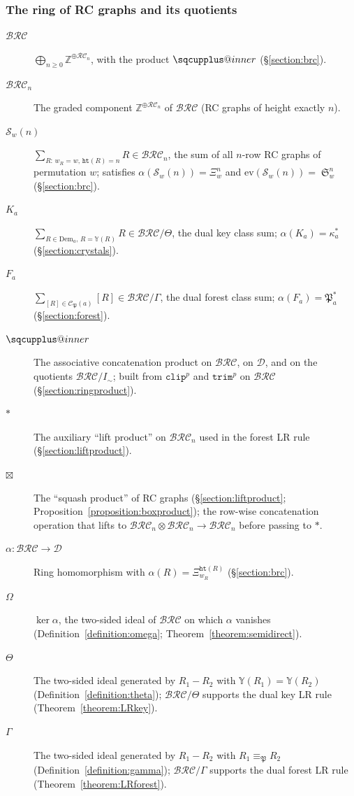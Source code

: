 \documentclass{amsart}
\makeatletter
\newcommand{\sqcupplus@inner}[2]{%
  \vcenter{\hbox{\ooalign{%
    \hfil$\m@th#1\sqcup$\hfil\cr
    \hfil\raisebox{0.15ex}{$\m@th#1\scriptscriptstyle+$}\hfil\cr
  }}}%
}
\newcommand{\sqcupplus}{\mathbin{\mathpalette\sqcupplus@inner\relax}}
\theoremstyle{definition}
\theoremstyle{remark}
\numberwithin{equation}{subsection}
\DeclareMathOperator{\sch}{\mathfrak{S}}
\newcommand{\wof}[1]{w_{#1}}
\newcommand{\trm}{\mathtt{trim}}
\newcommand{\hr}{\mathtt{ht}}
\newcommand{\clp}{\mathtt{clip}}
\newcommand{\BRC}{\mathcal{BRC}}
\newcommand{\RC}{\mathcal{RC}}
\newcommand{\dsch}{\ensuremath{\Xi}}
\newcommand{\dcoma}{\mathcal{D}}
\newcommand{\forest}{\mathfrak{P}}
\makeatother
\begin{document}
\subsubsection*{The ring of RC graphs and its quotients}
\begin{description}
\item[$\BRC$] $\bigoplus_{n\geq 0}\mathbb{Z}^{\oplus\RC_n}$, with the product $\sqcupplus$ (\S\ref{section:brc}).
\item[$\BRC_n$] The graded component $\mathbb{Z}^{\oplus \RC_n}$ of $\BRC$ (RC graphs of height exactly $n$).
\item[$\mathcal{S}_w(n)$] $\sum_{R:\,\wof{R}=w,\,\hr(R)=n}R\in\BRC_n$, the sum of all $n$-row RC graphs of permutation $w$; satisfies $\alpha(\mathcal{S}_w(n))=\dsch_w^n$ and $\mathrm{ev}(\mathcal{S}_w(n))=\sch_w^n$ (\S\ref{section:brc}).
\item[$K_a$] $\sum_{R\in\mathrm{Dem}_a,\,R=\mathbb{Y}(R)} R\in\BRC/\Theta$, the dual key class sum; $\alpha(K_a)=\kappa_a^*$ (\S\ref{section:crystals}).
\item[$F_a$] $\sum_{[R]\in\mathcal{C}_\forest(a)}[R]\in\BRC/\Gamma$, the dual forest class sum; $\alpha(F_a)=\forest_a^*$ (\S\ref{section:forest}).
\item[$\sqcupplus$] The associative concatenation product on $\BRC$, on $\dcoma$, and on the quotients $\BRC/I_\sim$; built from $\clp^p$ and $\trm^p$ on $\BRC$ (\S\ref{section:ringproduct}).
\item[$*$] The auxiliary ``lift product'' on $\BRC_n$ used in the forest LR rule (\S\ref{section:liftproduct}).
\item[$\boxtimes$] The ``squash product'' of RC graphs (\S\ref{section:liftproduct}; Proposition~\ref{proposition:boxproduct}); the row-wise concatenation operation that lifts to $\BRC_n\otimes\BRC_n\to\BRC_n$ before passing to $*$.
\item[$\alpha:\BRC\to\dcoma$] Ring homomorphism with $\alpha(R)=\dsch_{\wof{R}}^{\hr(R)}$ (\S\ref{section:brc}).
\item[$\Omega$] $\ker\alpha$, the two-sided ideal of $\BRC$ on which $\alpha$ vanishes (Definition~\ref{definition:omega}; Theorem~\ref{theorem:semidirect}).
\item[$\Theta$] The two-sided ideal generated by $R_1-R_2$ with $\mathbb{Y}(R_1)=\mathbb{Y}(R_2)$ (Definition~\ref{definition:theta}); $\BRC/\Theta$ supports the dual key LR rule (Theorem~\ref{theorem:LRkey}).
\item[$\Gamma$] The two-sided ideal generated by $R_1-R_2$ with $R_1\equiv_\forest R_2$ (Definition~\ref{definition:gamma}); $\BRC/\Gamma$ supports the dual forest LR rule (Theorem~\ref{theorem:LRforest}).

\end{description}
\end{document}
